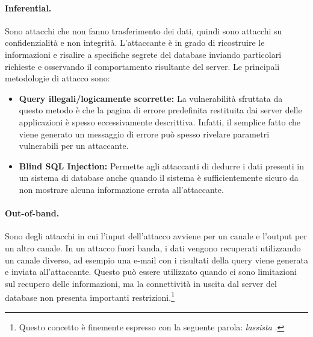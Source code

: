 \paragraph{Inferential.}
Sono attacchi che non fanno trasferimento dei dati, quindi sono attacchi su
confidenzialità e non integrità. L'attaccante è in
grado di ricostruire le informazioni e risalire a specifiche segrete del database
inviando particolari richieste
e osservando il comportamento risultante del server.
Le principali metodologie di attacco sono:
\begin{itemize}
    \item \textbf{Query illegali/logicamente scorrette:} La vulnerabilità
          sfruttata da questo metodo è che la pagina di errore
          predefinita restituita dai server delle applicazioni è
          spesso eccessivamente descrittiva. Infatti, il semplice
          fatto che viene generato un messaggio di errore può
          spesso rivelare parametri vulnerabili per un
          attaccante.

    \item \textbf{Blind SQL Injection:} Permette agli attaccanti di dedurre i
          dati presenti in un sistema di database anche quando il sistema è
          sufficientemente sicuro da non mostrare alcuna informazione errata
          all'attaccante.
\end{itemize}

\paragraph*{Out-of-band.}
Sono degli attacchi in cui l'input dell'attacco avviene per un canale e l'output
per un altro canale. In un attacco fuori banda, i dati vengono recuperati
utilizzando un canale diverso, ad esempio una e-mail con i risultati della query
viene generata e inviata all'attaccante. Questo può essere utilizzato quando ci
sono limitazioni sul recupero delle informazioni, ma la connettività in uscita
dal server del database non presenta importanti restrizioni.\footnote{Questo
    concetto è finemente espresso con la seguente parola: \textit{lassista}
    .}
